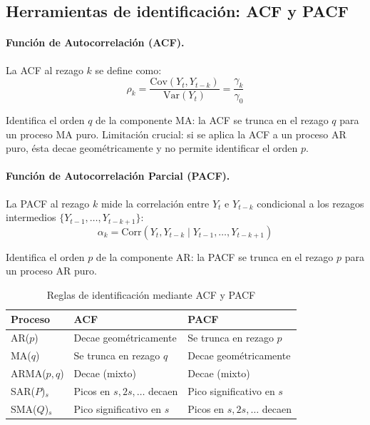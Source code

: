 \documentclass[12pt, a4paper]{article}
\begin{document}
\subsection{Herramientas de identificación: ACF y PACF}

\paragraph{Función de Autocorrelación (ACF).}

La ACF al rezago $k$ se define como:
\[
  \rho_k = \frac{\mathrm{Cov}(Y_t, Y_{t-k})}{\mathrm{Var}(Y_t)} = \frac{\gamma_k}{\gamma_0}
\]

Identifica el orden $q$ de la componente MA: la ACF se trunca en el rezago $q$
para un proceso MA puro. Limitación crucial: si se aplica la ACF a un proceso AR
puro, ésta decae geométricamente y no permite identificar el orden $p$.

\paragraph{Función de Autocorrelación Parcial (PACF).}

La PACF al rezago $k$ mide la correlación entre $Y_t$ e $Y_{t-k}$ condicional
a los rezagos intermedios $\{Y_{t-1},\ldots,Y_{t-k+1}\}$:
\[
  \alpha_k = \mathrm{Corr}(Y_t, Y_{t-k} \mid Y_{t-1},\ldots,Y_{t-k+1})
\]

Identifica el orden $p$ de la componente AR: la PACF se trunca en el rezago $p$
para un proceso AR puro.

\begin{table}[H]
  \centering
  \caption{Reglas de identificación mediante ACF y PACF}
  \label{tab:acfpacf}
  \begin{tabular}{lll}
    \toprule
    \textbf{Proceso} & \textbf{ACF} & \textbf{PACF} \\
    \midrule
    AR($p$)      & Decae geométricamente        & Se trunca en rezago $p$ \\
    MA($q$)      & Se trunca en rezago $q$       & Decae geométricamente \\
    ARMA($p,q$)  & Decae (mixto)                & Decae (mixto) \\
    SAR($P$)$_s$ & Picos en $s,2s,\ldots$ decaen & Pico significativo en $s$ \\
    SMA($Q$)$_s$ & Pico significativo en $s$     & Picos en $s,2s,\ldots$ decaen \\
    \bottomrule
  \end{tabular}
\end{table}
\end{document}
